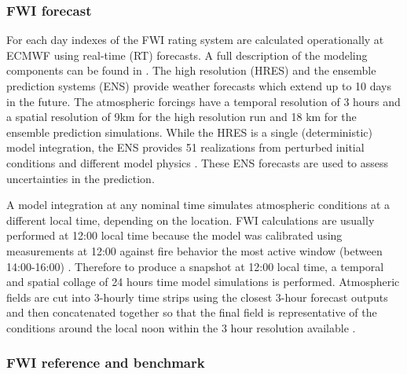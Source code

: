 \documentclass[, manuscript]{copernicus}
\begin{document}
\subsubsection{FWI forecast}

For each day indexes of the FWI rating system are calculated
operationally at ECMWF using real-time (RT) forecasts. A full
description of the modeling components can be found in
\citet{digiuseppe:16}. The high resolution (HRES) and the ensemble
prediction systems (ENS) provide weather forecasts which extend up to 10
days in the future. The atmospheric forcings have a temporal resolution
of 3 hours and a spatial resolution of 9km for the high resolution run
and 18 km for the ensemble prediction simulations. While the HRES is a
single (deterministic) model integration, the ENS provides 51
realizations from perturbed initial conditions and different model
physics \citep{buizza:99}. These ENS forecasts are used to assess
uncertainties in the prediction.

A model integration at any nominal time simulates atmospheric conditions
at a different local time, depending on the location. FWI calculations
are usually performed at 12:00 local time because the model was
calibrated using measurements at 12:00 against fire behavior the most
active window (between 14:00-16:00) \citep{vanwagner:87}. Therefore to
produce a snapshot at 12:00 local time, a temporal and spatial collage
of 24 hours time model simulations is performed. Atmospheric fields are
cut into 3-hourly time strips using the closest 3-hour forecast outputs
and then concatenated together so that the final field is representative
of the conditions around the local noon within the 3 hour resolution
available \citep{digiuseppe:16}.

\subsubsection{FWI reference and benchmark}
\end{document}

